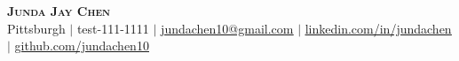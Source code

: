 
\begin{center}
    \textbf{\Huge \scshape Junda Jay Chen} \\ \vspace{1pt}
    \small Pittsburgh $|$ test-111-1111 $|$ \href{mailto:x@x.com}{\underline{jundachen10@gmail.com}} $|$ 
    \href{https://linkedin.com/in/jundachen}{\underline{linkedin.com/in/jundachen}} $|$
    \href{https://github.com/jundachen10}{\underline{github.com/jundachen10}}
\end{center}